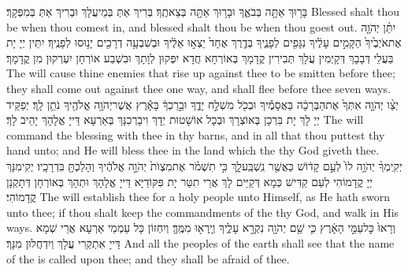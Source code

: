 {בָּר֥וּךְ אַתָּ֖ה בְּבֹאֶ֑ךָ וּבָר֥וּךְ אַתָּ֖ה בְּצֵאתֶֽךָ׃}
{בְּרִיךְ אַתְּ בְּמֵיעֲלָךְ וּבְרִיךְ אַתְּ בְּמִפְּקָךְ׃}
{Blessed shalt thou be when thou comest in, and blessed shalt thou be when thou goest out.}{}
{יִתֵּ֨ן יְהֹוָ֤ה אֶת\maqqaf אֹיְבֶ֙יךָ֙ הַקָּמִ֣ים עָלֶ֔יךָ נִגָּפִ֖ים לְפָנֶ֑יךָ בְּדֶ֤רֶךְ אֶחָד֙ יֵצְא֣וּ אֵלֶ֔יךָ וּבְשִׁבְעָ֥ה דְרָכִ֖ים יָנ֥וּסוּ לְפָנֶֽיךָ׃}
{יִתֵּין יְיָ יָת בַּעֲלֵי דְּבָבָךְ דְּקָיְמִין עֲלָךְ תְּבִירִין קֳדָמָךְ בְּאוֹרְחָא חֲדָא יִפְּקוּן לְוָתָךְ וּבִשְׁבַע אוֹרְחָן יִעְרְקוּן מִן קֳדָמָךְ׃}
{The \lord\space will cause thine enemies that rise up against thee to be smitten before thee; they shall come out against thee one way, and shall flee before thee seven ways.}{}
{יְצַ֨ו יְהֹוָ֤ה אִתְּךָ֙ אֶת\maqqaf הַבְּרָכָ֔ה בַּאֲסָמֶ֕יךָ וּבְכֹ֖ל מִשְׁלַ֣ח יָדֶ֑ךָ וּבֵ֣רַכְךָ֔ בָּאָ֕רֶץ אֲשֶׁר\maqqaf יְהֹוָ֥ה אֱלֹהֶ֖יךָ נֹתֵ֥ן לָֽךְ׃}
{יְפַקֵּיד יְיָ לָךְ יָת בִּרְכָן בְּאוֹצְרָךְ וּבְכָל אוֹשָׁטוּת יְדָךְ וִיבָרְכִנָּךְ בְּאַרְעָא דַּייָ אֱלָהָךְ יָהֵיב לָךְ׃}
{The \lord\space will command the blessing with thee in thy barns, and in all that thou puttest thy hand unto; and He will bless thee in the land which the \lord\space thy God giveth thee.}{}
{יְקִֽימְךָ֨ יְהֹוָ֥ה לוֹ֙ לְעַ֣ם קָד֔וֹשׁ כַּאֲשֶׁ֖ר נִֽשְׁבַּֽע\maqqaf לָ֑ךְ כִּ֣י תִשְׁמֹ֗ר אֶת\maqqaf מִצְוֺת֙ יְהֹוָ֣ה אֱלֹהֶ֔יךָ וְהָלַכְתָּ֖ בִּדְרָכָֽיו׃}
{יְקִימִנָּךְ יְיָ קֳדָמוֹהִי לְעַם קַדִּישׁ כְּמָא דְּקַיֵּים לָךְ אֲרֵי תִטַּר יָת פִּקּוֹדַיָּא דַּייָ אֱלָהָךְ וּתְהָךְ בְּאוֹרְחָן דְּתָקְנָן קֳדָמוֹהִי׃}
{The \lord\space will establish thee for a holy people unto Himself, as He hath sworn unto thee; if thou shalt keep the commandments of the \lord\space thy God, and walk in His ways.}{}
{וְרָאוּ֙ כׇּל\maqqaf עַמֵּ֣י הָאָ֔רֶץ כִּ֛י שֵׁ֥ם יְהֹוָ֖ה נִקְרָ֣א עָלֶ֑יךָ וְיָֽרְא֖וּ מִמֶּֽךָּ׃}
{וְיִחְזוֹן כָּל עַמְמֵי אַרְעָא אֲרֵי שְׁמָא דַּייָ אִתְקְרִי עֲלָךְ וְיִדְחֲלוּן מִנָּךְ׃}
{And all the peoples of the earth shall see that the name of the \lord\space is called upon thee; and they shall be afraid of thee.}{}
